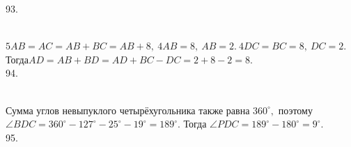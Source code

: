 \documentclass[12pt]{article}
\begin{document}
93. \begin{figure}[ht!]
\end{figure}\\
$5AB=AC=AB+BC=AB+8,\ 4AB=8,\ AB=2.\ 4DC=BC=8,\ DC=2.$ Тогда$AD=AB+BD=AD+BC-DC=2+8-2=8.$\\
94. \begin{figure}[ht!]
\end{figure}\\
Сумма углов невыпуклого четырёхугольника также равна $360^\circ,$ поэтому $\angle BDC=360^\circ-127^\circ-25^\circ-19^\circ=189^\circ.$ Тогда $\angle PDC=189^\circ-180^\circ=9^\circ.$\\
95. \begin{figure}[ht!]
\end{figure}\\
\end{document}
